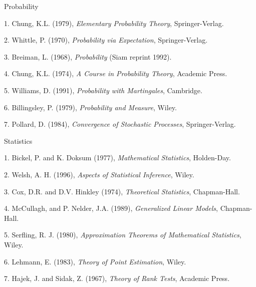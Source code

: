 \vspace{5mm}
\noindent
Probability

\vspace{3mm}

 1.   Chung, K.L. (1979), {\it Elementary Probability Theory}, Springer-Verlag.

 2.   Whittle, P. (1970), {\it Probability via Expectation}, Springer-Verlag.

 3.   Breiman, L. (1968), {\it Probability} (Siam reprint 1992).

 4.   Chung, K.L. (1974), {\it A Course in Probability Theory}, Academic Press.

 5.   Williams, D. (1991), {\it Probability with Martingales}, Cambridge.

 6.   Billingsley, P. (1979), {\it Probability and Measure}, Wiley.

 7.   Pollard, D. (1984), {\it Convergence of Stochastic Processes}, Springer-Verlag.

\vspace{3mm}
\noindent
Statistics

\vspace{3mm}
 1.  Bickel, P. and K. Doksum (1977), {\it Mathematical Statistics}, Holden-Day.

 2.  Welsh, A. H. (1996), {\it Aspects of Statistical Inference}, Wiley.

 3.   Cox, D.R. and D.V. Hinkley (1974), {\it Theoretical Statistics}, Chapman-Hall.

 4.   McCullagh,  and P. Nelder, J.A. (1989), {\it Generalized Linear Models}, Chapman-Hall.

 5.   Serfling, R. J. (1980), {\it Approximation Theorems of Mathematical 
Statistics}, Wiley.

 6.   Lehmann, E. (1983), {\it Theory of Point Estimation}, Wiley.

 7.   Hajek, J. and Sidak, Z. (1967), {\it Theory of Rank Tests}, Academic Press.


